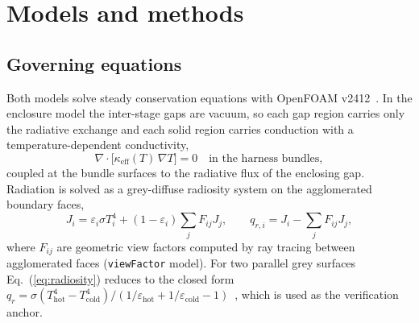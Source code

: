 \documentclass[preprint,12pt]{elsarticle}
\begin{document}
\section{Models and methods}
\label{sec:methods}

\subsection{Governing equations}
\label{sec:eqs}

Both models solve steady conservation equations with OpenFOAM
v2412~\cite{38-OpenFOAM2412}. In the enclosure model the inter-stage gaps are vacuum, so each
gap region carries only the radiative exchange and each solid region carries conduction with a
temperature-dependent conductivity,
\begin{equation}
\nabla\cdot\big[\kappa_{\mathrm{eff}}(T)\,\nabla T\big]=0 \quad\text{in the harness bundles},
\label{eq:solid}
\end{equation}
coupled at the bundle surfaces to the radiative flux of the enclosing gap. Radiation is
solved as a grey-diffuse radiosity system on the agglomerated boundary faces,
\begin{equation}
J_i=\varepsilon_i\sigma T_i^{4}+(1-\varepsilon_i)\sum_j F_{ij}J_j,\qquad
q_{r,i}=J_i-\sum_j F_{ij}J_j ,
\label{eq:radiosity}
\end{equation}
where $F_{ij}$ are geometric view factors computed by ray tracing between agglomerated faces
(\texttt{viewFactor} model). For two parallel grey surfaces Eq.~(\ref{eq:radiosity}) reduces to
the closed form $q_r=\sigma(T_{\mathrm{hot}}^4-T_{\mathrm{cold}}^4)/(1/\varepsilon_{\mathrm{hot}}
+1/\varepsilon_{\mathrm{cold}}-1)$~\cite{25-Bergman2017HeatTransfer}, which is used as the
verification anchor.
\end{document}
